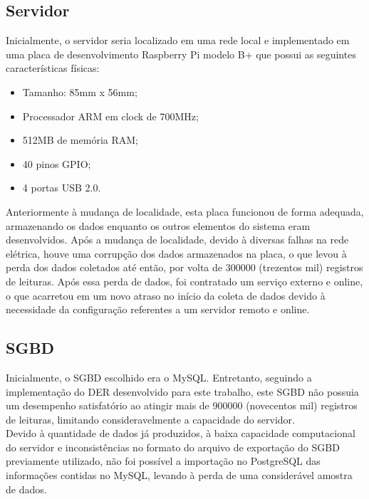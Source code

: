 \subsection{Servidor}
\quad Inicialmente, o servidor seria localizado em uma rede local e implementado em uma placa de desenvolvimento Raspberry Pi modelo B+ que possui as seguintes características físicas:
\begin{itemize}
  \item Tamanho: 85mm x 56mm;
  \item Processador ARM em clock de 700MHz;
  \item 512MB de memória RAM;
  \item 40 pinos GPIO;
  \item 4 portas USB 2.0.
\end{itemize}
\null\quad Anteriormente à mudança de localidade, esta placa funcionou de forma adequada, armazenando os dados enquanto os outros elementos do sistema eram desenvolvidos. Após a mudança de localidade, devido à diversas falhas na rede elétrica, houve uma corrupção dos dados armazenados na placa, o que levou à perda dos dados coletados até então, por volta de 300000 (trezentos mil) registros de leituras. Após essa perda de dados, foi contratado um serviço externo e online, o que acarretou em um novo atraso no início da coleta de dados devido à necessidade da configuração referentes a um servidor remoto e online.

\subsection{\acrlong{SGBD}}
\quad Inicialmente, o \acrshort{SGBD} escolhido era o MySQL. Entretanto, seguindo a implementação do \acrshort{DER} desenvolvido para este trabalho, este \acrlong{SGBD} não possuia um desempenho satisfatório ao atingir mais de 900000 (novecentos mil) registros de leituras, limitando consideravelmente a capacidade do servidor.
\\\null \quad Devido à quantidade de dados já produzidos, à baixa capacidade computacional do servidor e  inconsistências no formato do arquivo de exportação do \acrshort{SGBD} previamente utilizado, não foi possível a importação no PostgreSQL das informações contidas no MySQL, levando à perda de uma considerável amostra de dados.
